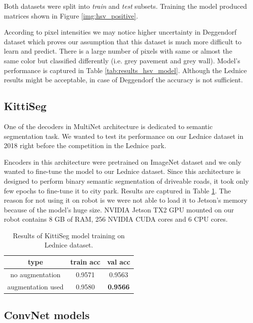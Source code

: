 Both datasets were split into \textit{train} and \textit{test} subsets. Training the
model produced matrices shown in Figure \ref{img:hsv_positive}.

According to pixel intensities we may notice higher uncertainty in Deggendorf dataset
which proves our assumption that this dataset is much more difficult to learn and predict.
There is a large number of pixels with same or almost the same color but classified
differently (i.e. grey pavement and grey wall).
Model's performance is captured in Table \ref{tab:results_hsv_model}. Although the Lednice
results might be acceptable, in case of Deggendorf the accuracy is not sufficient.


\subsection{KittiSeg}
\label{sec:kittiseg}

One of the decoders in MultiNet architecture \cite{bib:teichmann2018multinet}
is dedicated to semantic segmentation task. We wanted to test its performance on our Lednice
dataset in 2018 right before the competition in the Lednice park.

Encoders in this architecture were pretrained on ImageNet dataset \cite{bib:deng2009imagenet}
and we only wanted to fine-tune the model to our Lednice dataset. Since this architecture
is designed to perform binary semantic segmentation of driveable roads, it took
only few epochs to fine-tune it to city park. Results are captured in Table
\ref{tab:results_kittiseg}. The reason for not using it on robot is we were not able to
load it to Jetson's memory because of the model's huge size. NVIDIA Jetson TX2 GPU
mounted on our robot contains 8 GB of RAM, 256 NVIDIA CUDA cores and 6 CPU cores.

\begin{table}[h]
	\centering
	\begin{tabular}{|c||c|c|} 
		\hline
		type & train acc & val acc \\
		\hline
		no augmentation & 0.9571 & 0.9563 \\
		augmentation used & 0.9580 & \textbf{0.9566} \\
		\hline
	\end{tabular}
	\caption[Results of KittiSeg model training]{Results of KittiSeg model training on Lednice
	dataset.}
	\label{tab:results_kittiseg}
\end{table}

\subsection{ConvNet models}
\label{sec:first_results:convnets}

